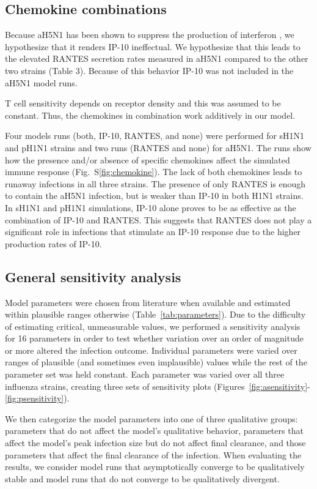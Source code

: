 \documentclass[10pt]{article}
\begin{document}
\subsection{Chemokine combinations}

Because aH5N1 has been shown to suppress the production of interferon \cite{Mitchell2011}, we hypothesize that it renders IP-10 ineffectual.  We hypothesize that this leads to the elevated RANTES secretion rates measured in aH5N1 compared to the other two strains (Table 3).  Because of this behavior IP-10 was not included in the aH5N1 model runs. 

T cell sensitivity depends on receptor density \cite{Desmetz2006} and this was assumed to be constant.  Thus, the chemokines in combination work additively in our model. 

Four models runs (both, IP-10, RANTES, and none) were performed for sH1N1 and pH1N1 strains and two runs (RANTES and none) for  aH5N1.  The runs show how the presence and/or absence of specific chemokines affect the simulated immune response (Fig.~S\ref{fig:chemokine}).  The lack of both chemokines leads to runaway infections in all three strains.  The presence of only RANTES is enough to contain the aH5N1 infection, but is weaker than IP-10 in both H1N1 strains.  In sH1N1 and pH1N1 simulations, IP-10 alone proves to be as effective as the combination of IP-10 and RANTES.  This suggests that RANTES does not play a significant role in infections that stimulate an IP-10 response due to the higher production rates of IP-10.  


\subsection{General sensitivity analysis}

Model parameters were chosen from literature when available and estimated within plausible ranges otherwise (Table~\ref{tab:parameters}).  Due to the difficulty of estimating critical, unmeasurable values, we performed a sensitivity analysis for 16 parameters in order to test whether variation over an order of magnitude or more altered the infection outcome.  Individual parameters were varied over ranges of plausible (and sometimes even implausible) values while the rest of the parameter set was held constant.  Each parameter was varied over all three influenza strains, creating three sets of sensitivity plots (Figures~\ref{fig:asensitivity}-\ref{fig:psensitivity}).

We then categorize the model parameters into one of three qualitative groups: parameters that do not affect the model's qualitative behavior, parameters that affect the model's peak infection size but do not affect final clearance, and those parameters that affect the final clearance of the infection.  When evaluating the results, we consider model runs that asymptotically converge to be qualitatively stable and model runs that do not converge to be qualitatively divergent.
\end{document}
